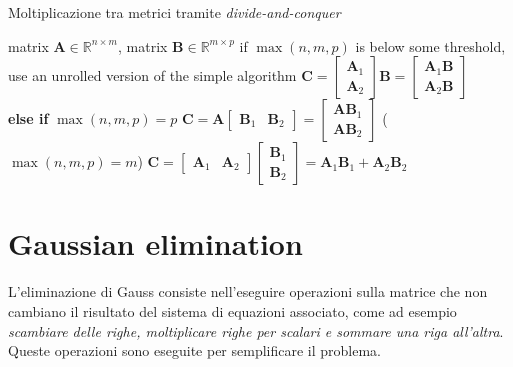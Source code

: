 \documentclass[10pt]{article}
\begin{document}
\begin{algorithm}
\caption{Moltiplicazione tra metrici tramite \textit{divide-and-conquer}}\label{alg:mul_div_conq}
\begin{algorithmic}[1]
\Require matrix $\mathbf{A} \in \mathbb{R}^{n\times m}$, matrix $\mathbf{B} \in \mathbb{R}^{m\times p}$
\State if $\max(n,m,p)$ is below some threshold, use an unrolled version of the simple algorithm
	\State $\mathbf{C} = \begin{bmatrix} \mathbf{A}_1 \\ \mathbf{A}_2 \end{bmatrix}\mathbf{B} = \begin{bmatrix} \mathbf{A}_1 \mathbf{B} \\ \mathbf{A}_2 \mathbf{B} \end{bmatrix}$ 
\\\textbf{else if} $\max(n,m,p) = p$
	\State $\mathbf{C} = \mathbf{A}\begin{bmatrix} \mathbf{B}_1 & \mathbf{B}_2 \end{bmatrix} = \begin{bmatrix} \mathbf{A} \mathbf{B}_1 \\ \mathbf{A} \mathbf{B}_2 \end{bmatrix}$ 
\Else \Comment($\max(n,m,p) = m$)
	\State $\mathbf{C} = \begin{bmatrix} \mathbf{A}_1 & \mathbf{A}_2 \end{bmatrix}\begin{bmatrix} \mathbf{B}_1 \\ \mathbf{B}_2 \end{bmatrix} = \mathbf{A}_1 \mathbf{B}_1 + \mathbf{A}_2 \mathbf{B}_2$ 
\EndIf
\end{algorithmic}
\end{algorithm}






\section{Gaussian elimination}

L'eliminazione di Gauss consiste nell'eseguire operazioni sulla matrice che non cambiano il risultato del sistema di equazioni associato, come ad esempio \textit{scambiare delle righe, moltiplicare righe per scalari e sommare una riga all'altra}. Queste operazioni sono eseguite per semplificare il problema.
\end{document}
